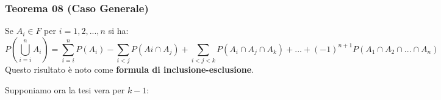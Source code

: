 \subsubsection{Teorema 08 (Caso Generale)}
Se $A_i \in F$ per $i = 1,2,...,n$ si ha:
$$ P(\bigcup_{i=i}^n A_i) = \sum_{i=i}^n P(A_i) - \sum_{i<j} P(Ai \cap A_j) + \sum_{i<j<k} P(A_i \cap A_j \cap A_k) +...+ (-1)^{n+1} P(A_1 \cap A_2 \cap ... \cap A_n)$$
Questo risultato è noto come \textbf{formula di inclusione-esclusione}.


Supponiamo ora la tesi vera per $k-1$:









